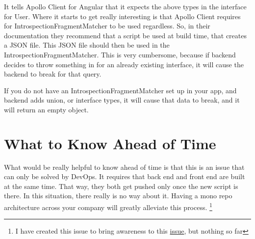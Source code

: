 It tells Apollo Client for Angular that it expects the above types in the interface for User. Where it starts to get really interesting is that Apollo Client requires for IntrospectionFragmentMatcher to be used regardless. So, in their documentation they recommend that a script be used at build time, that creates a JSON file. This JSON file should then be used in the IntrospectionFragmentMatcher. This is very cumbersome, because if backend decides to throw something in for an already existing interface, it will cause the backend to break for that query.

If you do not have an IntrospectionFragmentMatcher set up in your app, and backend adds union, or interface types, it will cause that data to break, and it will return an empty object.


\section{ What to Know Ahead of Time }
What would be really helpful to know ahead of time is that this is an issue that can only be solved by DevOps. It requires that back end and front end are built at the same time. That way, they both get pushed only once the new script is there. In this situation, there really is no way about it. Having a mono repo architecture across your company will greatly alleviate this process.
\footnote{I have created this issue to bring awareness to this \href{https://github.com/apollographql/apollo-client/issues/4202}{issue}, but nothing so far}